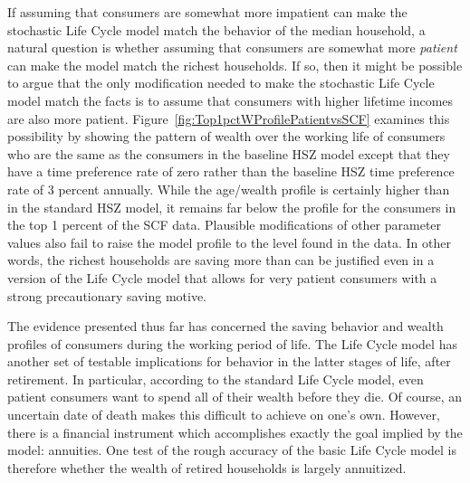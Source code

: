 \documentclass[titlepage,12pt]{article}
\begin{document}
If assuming that consumers are somewhat more impatient can make the 
stochastic Life Cycle model match the behavior of the median 
household, a natural question is whether assuming that consumers are 
somewhat more {\it patient} can make the model match the richest 
households.  If so, then it might be possible to argue that the only 
modification needed to make the stochastic Life Cycle model match the 
facts is to assume that consumers with higher lifetime incomes are 
also more patient.  Figure~\ref{fig:Top1pctWProfilePatientvsSCF} 
examines this possibility by showing the pattern of wealth over the 
working life of consumers who are the same as the consumers in the 
baseline HSZ model except that they have a time preference rate of 
zero rather than the baseline HSZ time preference rate of 3 percent 
annually.  While the age/wealth profile is certainly higher than in 
the standard HSZ model, it remains far below the profile for 
the consumers in the top 1 percent of the SCF data.  Plausible 
modifications of other parameter values also fail to raise the model 
profile to the level found in the data.  In other words, the richest 
households are saving more than can be justified even in a version of 
the Life Cycle model that allows for very patient consumers with a 
strong precautionary saving motive.

\hypertarget{Top1pctWProfilePatientvsSCF}{}

The evidence presented thus far has concerned the saving behavior and 
wealth profiles of consumers during the working period of life.  The 
Life Cycle model has another set of testable implications for behavior 
in the latter stages of life, after retirement.  In particular, 
according to the standard Life Cycle model, even patient consumers 
want to spend all of their wealth before they die.  Of course, an 
uncertain date of death makes this difficult to achieve on one's own.  
However, there is a financial instrument which accomplishes exactly 
the goal implied by the model: annuities.  One test of the rough 
accuracy of the basic Life Cycle model is therefore whether the wealth 
of retired households is largely annuitized.
\end{document}
